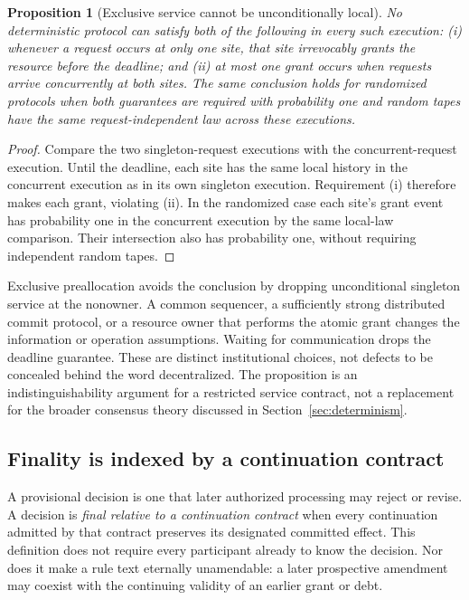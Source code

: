 \documentclass[11pt,letterpaper]{article}
\theoremstyle{plain}
\newtheorem{proposition}{Proposition}[section]
\theoremstyle{definition}
\theoremstyle{remark}
\begin{document}
\begin{proposition}[Exclusive service cannot be unconditionally local]\label{prop:exclusive-service}
No deterministic protocol can satisfy both of the following in every such execution: (i) whenever a request occurs at only one site, that site irrevocably grants the resource before the deadline; and (ii) at most one grant occurs when requests arrive concurrently at both sites. The same conclusion holds for randomized protocols when both guarantees are required with probability one and random tapes have the same request-independent law across these executions.
\end{proposition}
\begin{proof}
Compare the two singleton-request executions with the concurrent-request execution. Until the deadline, each site has the same local history in the concurrent execution as in its own singleton execution. Requirement (i) therefore makes each grant, violating (ii). In the randomized case each site's grant event has probability one in the concurrent execution by the same local-law comparison. Their intersection also has probability one, without requiring independent random tapes.
\end{proof}

Exclusive preallocation avoids the conclusion by dropping unconditional singleton service at the nonowner. A common sequencer, a sufficiently strong distributed commit protocol, or a resource owner that performs the atomic grant changes the information or operation assumptions. Waiting for communication drops the deadline guarantee. These are distinct institutional choices, not defects to be concealed behind the word decentralized. The proposition is an indistinguishability argument for a restricted service contract, not a replacement for the broader consensus theory discussed in Section~\ref{sec:determinism}.

\subsection{Finality is indexed by a continuation contract}
A provisional decision is one that later authorized processing may reject or revise. A decision is \emph{final relative to a continuation contract} when every continuation admitted by that contract preserves its designated committed effect. This definition does not require every participant already to know the decision. Nor does it make a rule text eternally unamendable: a later prospective amendment may coexist with the continuing validity of an earlier grant or debt.
\end{document}
